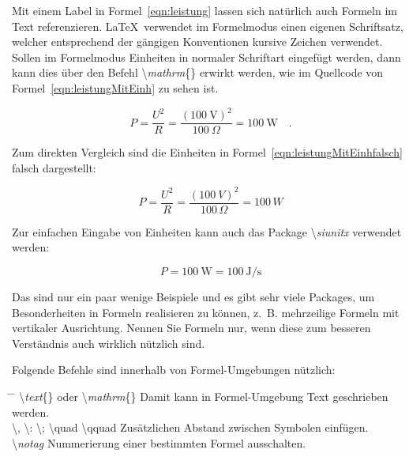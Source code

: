 Mit einem Label in Formel~\ref{eqn:leistung} lassen sich natürlich auch Formeln im Text referenzieren. \LaTeX~verwendet im Formelmodus einen eigenen Schriftsatz, welcher entsprechend der gängigen Konventionen kursive Zeichen verwendet. Sollen im Formelmodus Einheiten in normaler Schriftart eingefügt werden, dann kann dies über den Befehl \textbackslash \textit{mathrm}\{\} erwirkt werden, wie im Quellcode von Formel~\ref{eqn:leistungMitEinh} zu sehen ist.

\begin{equation}
P=\frac{U^2}{R} = \frac{\left( 100~\mathrm{V}\right)^2}{100~\Omega} = 100~\mathrm{W}\quad .
\label{eqn:leistungMitEinh}
\end{equation}

Zum direkten Vergleich sind die Einheiten in Formel~\ref{eqn:leistungMitEinhfalsch} falsch dargestellt:

\begin{equation}
P=\frac{U^2}{R} = \frac{\left( 100~V\right)^2}{100\,\varOmega} = 100\,W
\label{eqn:leistungMitEinhfalsch}
\end{equation}

Zur einfachen Eingabe von Einheiten kann auch das Package \textbackslash \textit{siunitx} verwendet werden:

\begin{equation}
	P=\SI{100}{\watt}=\SI{100}{\joule\per\second}
\end{equation}

Das sind nur ein paar wenige Beispiele und es gibt sehr viele Packages, um Besonderheiten in Formeln realisieren zu können, z.~B. mehrzeilige Formeln mit vertikaler Ausrichtung. Nennen Sie Formeln nur, wenn diese zum besseren Verständnis auch wirklich nützlich sind.

Folgende Befehle sind innerhalb von Formel-Umgebungen nützlich:
\begin{tabbing}
	\hspace*{0cm} \= \hspace{0.3\linewidth} \= \+\kill
	\textbackslash \textit{text}\{\} oder \textbackslash \textit{mathrm}\{\}	\> Damit kann in Formel-Umgebung Text geschrieben werden.\\ 
	\textbackslash, \textbackslash: \textbackslash; \textbackslash quad \textbackslash qquad \> Zusätzlichen Abstand zwischen Symbolen einfügen.\\
	\textbackslash \textit{notag} \> Nummerierung einer bestimmten Formel ausschalten.
\end{tabbing}


